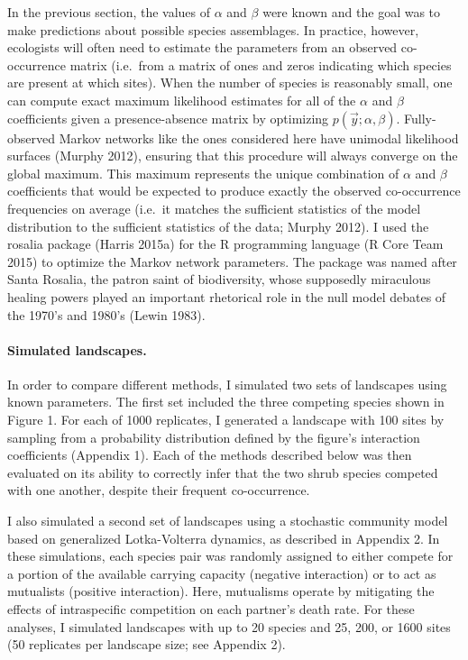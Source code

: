 \documentclass[12pt,]{article}
\begin{document}
\begin{spacing}{1.9}
\begin{flushleft}
In the previous section, the values of \(\alpha\) and \(\beta\) were
known and the goal was to make predictions about possible species
assemblages. In practice, however, ecologists will often need to
estimate the parameters from an observed co-occurrence matrix (i.e.~from
a matrix of ones and zeros indicating which species are present at which
sites). When the number of species is reasonably small, one can compute
exact maximum likelihood estimates for all of the \(\alpha\) and
\(\beta\) coefficients given a presence-absence matrix by optimizing
\(p(\vec{y}; \alpha, \beta)\). Fully-observed Markov networks like the
ones considered here have unimodal likelihood surfaces (Murphy 2012),
ensuring that this procedure will always converge on the global maximum.
This maximum represents the unique combination of \(\alpha\) and
\(\beta\) coefficients that would be expected to produce exactly the
observed co-occurrence frequencies on average (i.e.~it matches the
sufficient statistics of the model distribution to the sufficient
statistics of the data; Murphy 2012). I used the rosalia package (Harris
2015a) for the R programming language (R Core Team 2015) to optimize the
Markov network parameters. The package was named after Santa Rosalia,
the patron saint of biodiversity, whose supposedly miraculous healing
powers played an important rhetorical role in the null model debates of
the 1970's and 1980's (Lewin 1983).

\paragraph{Simulated landscapes.}\label{simulated-landscapes.}

In order to compare different methods, I simulated two sets of
landscapes using known parameters. The first set included the three
competing species shown in Figure 1. For each of 1000 replicates, I
generated a landscape with 100 sites by sampling from a probability
distribution defined by the figure's interaction coefficients (Appendix
1). Each of the methods described below was then evaluated on its
ability to correctly infer that the two shrub species competed with one
another, despite their frequent co-occurrence.

I also simulated a second set of landscapes using a stochastic community
model based on generalized Lotka-Volterra dynamics, as described in
Appendix 2. In these simulations, each species pair was randomly
assigned to either compete for a portion of the available carrying
capacity (negative interaction) or to act as mutualists (positive
interaction). Here, mutualisms operate by mitigating the effects of
intraspecific competition on each partner's death rate. For these
analyses, I simulated landscapes with up to 20 species and 25, 200, or
1600 sites (50 replicates per landscape size; see Appendix 2).


\end{flushleft}
\end{spacing}
\end{document}
